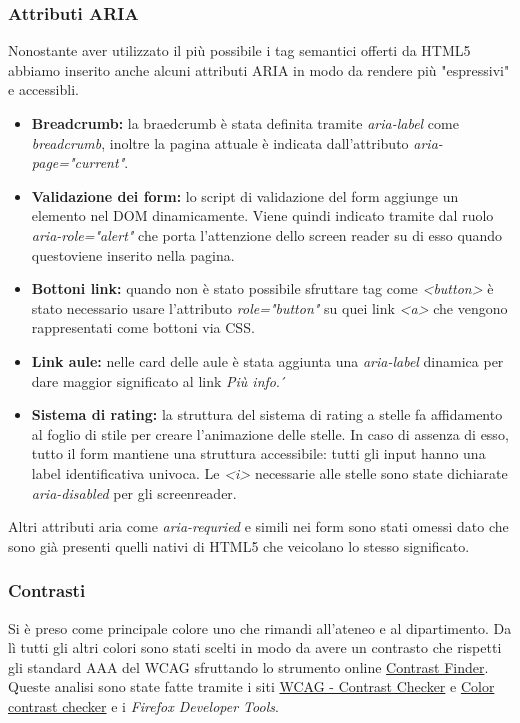 \subsubsection{Attributi ARIA}
Nonostante aver utilizzato il più possibile i tag semantici offerti da HTML5 abbiamo inserito anche alcuni attributi ARIA in modo da rendere più "espressivi" e accessibli.
\begin{itemize}
    \item \textbf{Breadcrumb:} la braedcrumb è stata definita tramite \textit{aria-label} come \textit{breadcrumb}, inoltre la pagina attuale è indicata dall'attributo \textit{aria-page="current"}.
    \item \textbf{Validazione dei form:} lo script di validazione del form aggiunge un elemento nel DOM dinamicamente. Viene quindi indicato tramite dal ruolo \textit{aria-role="alert"} che porta l'attenzione dello screen reader su di esso quando questoviene inserito nella pagina.
    \item \textbf{Bottoni link:} quando non è stato possibile sfruttare tag come \textit{<button>} è stato necessario usare l'attributo \textit{role="button"} su quei link \textit{<a>} che vengono rappresentati come bottoni via CSS.
    \item \textbf{Link aule:} nelle card delle aule è stata aggiunta una \textit{aria-label} dinamica per dare maggior significato al link \textit{Più info}.´
    \item \textbf{Sistema di rating:} la struttura del sistema di rating a stelle fa affidamento al foglio di stile per creare l'animazione delle stelle. In caso di assenza di esso, tutto il form mantiene una struttura accessibile: tutti gli input hanno una label identificativa univoca. Le \textit{<i>} necessarie alle stelle sono state dichiarate \textit{aria-disabled} per gli screenreader.
\end{itemize}
Altri attributi aria come \textit{aria-requried} e simili nei form sono stati omessi dato che sono già presenti quelli nativi di HTML5 che veicolano lo stesso significato.

\subsubsection{Contrasti}
Si è preso come principale colore uno che rimandi all'ateneo e al dipartimento. Da lì tutti gli altri colori sono stati scelti in modo da avere un contrasto che rispetti gli standard AAA del WCAG sfruttando lo strumento online \href{https://app.contrast-finder.org/}{Contrast Finder}. Queste analisi sono state fatte tramite i siti \href{https://contrastchecker.com/}{WCAG - Contrast Checker} e \href{https://coolors.co/}{Color contrast checker} e i \textit{Firefox Developer Tools}.

